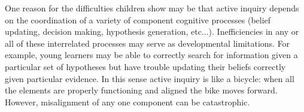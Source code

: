 \documentclass[10pt,letterpaper]{article}
\begin{document}
One reason for the difficulties children show may be that 
active inquiry depends on the coordination of a variety of 
component cognitive processes (belief updating, decision making, hypothesis generation, etc...).  
Inefficiencies in any or all of these interrelated processes may serve as developmental limitations.  
For example, young learners may be able to correctly search for information given a particular 
set of hypotheses but have trouble updating their beliefs correctly given particular evidence.
In this sense active inquiry is like a bicycle: when all the elements are properly functioning
and aligned the bike moves forward.  However, misalignment of any one component can
be catastrophic.

%





%
\end{document}
